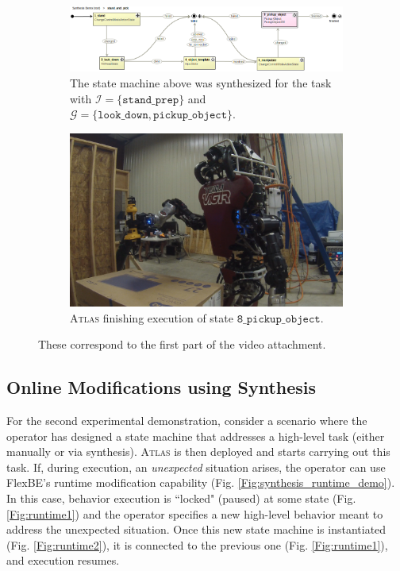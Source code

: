 \begin{figure}[t]
	\centering
	\begin{subfigure}[b]{0.99\columnwidth}
	\includegraphics[width=0.99\columnwidth,clip]{./img/stand_and_pick_sm.png}
	\caption{The state machine above was synthesized for the task with $\mathcal{I} = \{ \mathtt{stand\_prep} \}$ and $\mathcal{G} = \{ \mathtt{look\_down}, \mathtt{pickup\_object} \}$.
	}
	\label{Fig:stand_and_pick_sm}
	\end{subfigure}
	
	\vspace{4 pt}
	\begin{subfigure}[b]{0.95\columnwidth}
	\includegraphics[width=0.99\columnwidth, clip]{./img/stand_and_pick_gopro.png}
	\caption{\textsc{Atlas} finishing execution of state $\mathtt{8\_pickup\_object}$.
	} 
	\label{Fig:stand_and_pick_gopro}
	\end{subfigure}
	\caption{These correspond to the first part of the video attachment.
	}
	\label{Fig:stand_and_pick_demo}
\end{figure}

\subsection{Online Modifications using Synthesis}

For the second experimental demonstration, consider a scenario where the operator has designed a state machine that addresses a high-level task (either manually or via synthesis).
\textsc{Atlas} is then deployed and starts carrying out this task.
If, during execution, an \emph{unexpected} situation arises, the operator can use FlexBE's runtime modification capability (Fig. \ref{Fig:synthesis_runtime_demo}).
In this case, behavior execution is ``locked" (paused) at some state (Fig. \ref{Fig:runtime1}) and the operator specifies a new high-level behavior meant to address the unexpected situation.
Once this new state machine is instantiated (Fig. \ref{Fig:runtime2}), it is connected to the previous one (Fig. \ref{Fig:runtime1}), and execution resumes.


